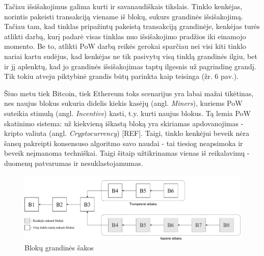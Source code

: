 Tačiau išsišakojimus galima kurti ir savanaudiškais tikslais. Tinklo kenkėjas, norintis pakeisti transakciją viename iš blokų, sukurs grandinės išsišakojimą. Tačiau tam, kad tinklas pripažintų pakeistą transakciją grandinėje, kenkėjas turės atlikti darbą, kurį padarė visas tinklas nuo išsišakojimo pradžios iki einamojo momento. Be to, atlikti PoW darbą reikės gerokai sparčiau nei visi kiti tinklo nariai kartu sudėjus, kad kenkėjas ne tik pasivytų visą tinklą grandinės ilgiu, bet ir jį aplenktų, kad jo grandinės išsišakojimas taptų ilgesnis už pagrindinę grandį. Tik tokiu atveju piktybinė grandis būtų parinkta kaip teisinga (žr. 6 pav.).

Šiuo metu tiek Bitcoin, tiek Ethereum toks scenarijus yra labai mažai tikėtinas, nes naujus blokus sukuria didelis kiekis kasėjų (angl. \textit{Miners}), kuriems PoW suteikia stimulą (angl. \textit{Incentive}) kasti, t.y. kurti naujus blokus. Tą lemia PoW skatinimo sistema: už kiekvieną iškastą bloką yra skiriamas apdovanojimas - kripto valiuta (angl. \textit{Cryptocurrency}) [REF]. Taigi, tinklo kenkėjui beveik nėra šansų pakreipti konsensuso algoritmo savo naudai - tai tiesiog neapsimoka ir beveik neįmanoma techniškai. Taigi šitaip užtikrinamas vienas iš reikalavimų - duomenų patvarumas ir nesuklastojamumas.

\begin{figure}[H]
    \centering
    \includegraphics[scale=0.5]{images/blockchain-branches}
    \caption{Blokų grandinės šakos}
\end{figure}





